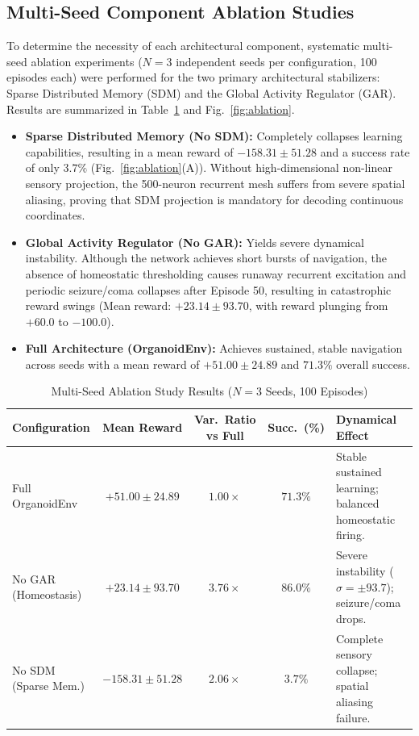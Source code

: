 \documentclass[journal,twocolumn]{IEEEtran}
\begin{document}
\subsection{Multi-Seed Component Ablation Studies}\label{sec:ablation}

To determine the necessity of each architectural component, systematic multi-seed ablation experiments ($N=3$ independent seeds per configuration, 100 episodes each) were performed for the two primary architectural stabilizers: Sparse Distributed Memory (SDM) and the Global Activity Regulator (GAR). Results are summarized in Table~\ref{table:ablation} and Fig.~\ref{fig:ablation}.

\begin{itemize}
\item \textbf{Sparse Distributed Memory (No SDM):} Completely collapses learning capabilities, resulting in a mean reward of $-158.31 \pm 51.28$ and a success rate of only $3.7\%$ (Fig.~\ref{fig:ablation}(A)). Without high-dimensional non-linear sensory projection, the 500-neuron recurrent mesh suffers from severe spatial aliasing, proving that SDM projection is mandatory for decoding continuous coordinates.
\item \textbf{Global Activity Regulator (No GAR):} Yields severe dynamical instability. Although the network achieves short bursts of navigation, the absence of homeostatic thresholding causes runaway recurrent excitation and periodic seizure/coma collapses after Episode 50, resulting in catastrophic reward swings (Mean reward: $+23.14 \pm 93.70$, with reward plunging from $+60.0$ to $-100.0$).
\item \textbf{Full Architecture (OrganoidEnv):} Achieves sustained, stable navigation across seeds with a mean reward of $+51.00 \pm 24.89$ and $71.3\%$ overall success.
\end{itemize}

\begin{table}[h]
\centering
\renewcommand{\arraystretch}{1.3}
\caption{Multi-Seed Ablation Study Results ($N=3$ Seeds, 100 Episodes)}
\label{table:ablation}
\begin{tabularx}{\linewidth}{l c c c X}
\toprule
\textbf{Configuration} & \textbf{Mean Reward} & \textbf{Var.\ Ratio vs Full} & \textbf{Succ.\ (\%)} & \textbf{Dynamical Effect} \\
\midrule
Full OrganoidEnv       & $\mathbf{+51.00 \pm 24.89}$ & $\mathbf{1.00\times}$ & $\mathbf{71.3\%}$ & Stable sustained learning; balanced homeostatic firing. \\
No GAR (Homeostasis)   & $+23.14 \pm 93.70$          & $3.76\times$          & $86.0\%$          & Severe instability ($\sigma = \pm 93.7$); seizure/coma drops. \\
No SDM (Sparse Mem.)   & $-158.31 \pm 51.28$         & $2.06\times$          & $3.7\%$           & Complete sensory collapse; spatial aliasing failure. \\
\bottomrule
\end{tabularx}
\end{table}
\end{document}
